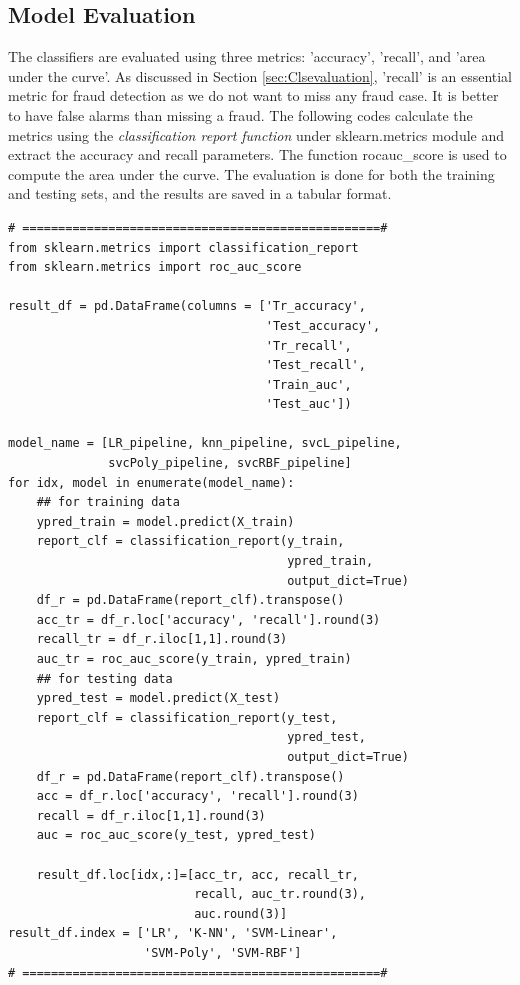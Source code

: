 \subsection{Model Evaluation}
The classifiers are evaluated using three metrics: 'accuracy', 'recall', and 'area under the curve'. As discussed in Section \ref{sec:Clsevaluation}, 'recall' is an essential metric for fraud detection as we do not want to miss any fraud case. It is better to have false alarms than missing a fraud. The following codes calculate the metrics using the \emph{classification report function} under sklearn.metrics module  and extract the accuracy and recall parameters. The function roc\-auc\_score is used to compute the area under the curve. The evaluation is done for both the training and testing sets, and the results are saved in a tabular format.

\begin{lstlisting}
# ==================================================#
from sklearn.metrics import classification_report
from sklearn.metrics import roc_auc_score

result_df = pd.DataFrame(columns = ['Tr_accuracy',
                                    'Test_accuracy',
                                    'Tr_recall',
                                    'Test_recall',
                                    'Train_auc',
                                    'Test_auc'])

model_name = [LR_pipeline, knn_pipeline, svcL_pipeline,
              svcPoly_pipeline, svcRBF_pipeline]
for idx, model in enumerate(model_name):
    ## for training data
    ypred_train = model.predict(X_train)
    report_clf = classification_report(y_train,
                                       ypred_train,
                                       output_dict=True)
    df_r = pd.DataFrame(report_clf).transpose()
    acc_tr = df_r.loc['accuracy', 'recall'].round(3)
    recall_tr = df_r.iloc[1,1].round(3)
    auc_tr = roc_auc_score(y_train, ypred_train)
    ## for testing data
    ypred_test = model.predict(X_test)
    report_clf = classification_report(y_test,
                                       ypred_test,
                                       output_dict=True)
    df_r = pd.DataFrame(report_clf).transpose()
    acc = df_r.loc['accuracy', 'recall'].round(3)
    recall = df_r.iloc[1,1].round(3)
    auc = roc_auc_score(y_test, ypred_test)

    result_df.loc[idx,:]=[acc_tr, acc, recall_tr,
                          recall, auc_tr.round(3),
                          auc.round(3)]
result_df.index = ['LR', 'K-NN', 'SVM-Linear',
                   'SVM-Poly', 'SVM-RBF']
# ==================================================#
\end{lstlisting}

